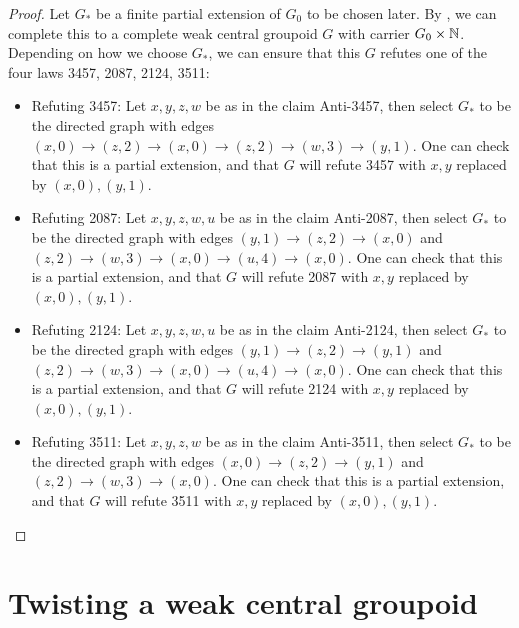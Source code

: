 \begin{proof}
  Let $G_*$ be a finite partial extension of $G_0$ to be chosen later. By , we can complete this to a complete weak central groupoid $G$ with carrier $G_0 \times \mathbb{N}$. Depending on how we choose $G_*$, we can ensure that this $G$ refutes one of the four laws 3457, 2087, 2124, 3511:
  \begin{itemize}
   \item Refuting 3457: Let $x,y,z,w$ be as in the claim Anti-3457, then select $G_*$ to be the directed graph with edges $(x,0) \to (z,2) \to (x,0) \to (z,2) \to (w,3) \to (y,1)$. One can check that this is a partial extension, and that $G$ will refute 3457 with $x,y$ replaced by $(x,0),(y,1)$.
   \item Refuting 2087: Let $x,y,z,w,u$ be as in the claim Anti-2087, then select $G_*$ to be the directed graph with edges $(y,1) \to (z,2) \to (x,0)$ and $(z,2) \to (w,3) \to (x,0) \to (u,4) \to (x,0)$. One can check that this is a partial extension, and that $G$ will refute 2087 with $x,y$ replaced by $(x,0),(y,1)$.
   \item Refuting 2124: Let $x,y,z,w,u$ be as in the claim Anti-2124, then select $G_*$ to be the directed graph with edges $(y,1) \to (z,2) \to (y,1)$ and $(z,2) \to (w,3) \to (x,0) \to (u,4) \to (x,0)$. One can check that this is a partial extension, and that $G$ will refute 2124 with $x,y$ replaced by $(x,0),(y,1)$.
   \item Refuting 3511: Let $x,y,z,w$ be as in the claim Anti-3511, then select $G_*$ to be the directed graph with edges $(x,0) \to (z,2) \to (y,1)$ and $(z,2) \to (w,3) \to (x,0)$. One can check that this is a partial extension, and that $G$ will refute 3511 with $x,y$ replaced by $(x,0),(y,1)$.
  \end{itemize}
\end{proof}


\section{Twisting a weak central groupoid}\label{twist-sec}

